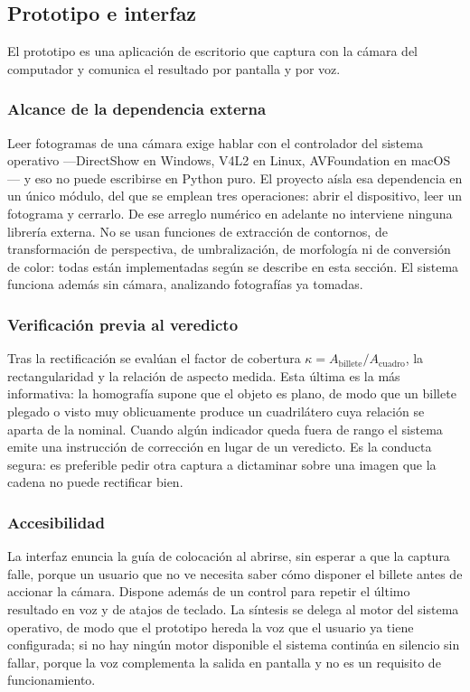 \documentclass[conference]{IEEEtran}
\begin{document}
\subsection{Prototipo e interfaz}

El prototipo es una aplicación de escritorio que captura con la cámara
del computador y comunica el resultado por pantalla y por voz.

\subsubsection{Alcance de la dependencia externa}
Leer fotogramas de una cámara exige hablar con el controlador del
sistema operativo ---DirectShow en Windows, V4L2 en Linux,
AVFoundation en macOS--- y eso no puede escribirse en Python puro. El
proyecto aísla esa dependencia en un único módulo, del que se emplean
tres operaciones: abrir el dispositivo, leer un fotograma y cerrarlo.
De ese arreglo numérico en adelante no interviene ninguna librería
externa. No se usan funciones de extracción de contornos, de
transformación de perspectiva, de umbralización, de morfología ni de
conversión de color: todas están implementadas según se describe en
esta sección. El sistema funciona además sin cámara, analizando
fotografías ya tomadas.

\subsubsection{Verificación previa al veredicto}
Tras la rectificación se evalúan el factor de cobertura
$\kappa = A_{\text{billete}}/A_{\text{cuadro}}$, la rectangularidad y
la relación de aspecto medida. Esta última es la más informativa: la
homografía supone que el objeto es plano, de modo que un billete
plegado o visto muy oblicuamente produce un cuadrilátero cuya relación
se aparta de la nominal. Cuando algún indicador queda fuera de rango el
sistema emite una instrucción de corrección en lugar de un veredicto.
Es la conducta segura: es preferible pedir otra captura a dictaminar
sobre una imagen que la cadena no puede rectificar bien.

\subsubsection{Accesibilidad}
La interfaz enuncia la guía de colocación al abrirse, sin esperar a que
la captura falle, porque un usuario que no ve necesita saber cómo
disponer el billete antes de accionar la cámara. Dispone además de un
control para repetir el último resultado en voz y de atajos de teclado.
La síntesis se delega al motor del sistema operativo, de modo que el
prototipo hereda la voz que el usuario ya tiene configurada; si no hay
ningún motor disponible el sistema continúa en silencio sin fallar,
porque la voz complementa la salida en pantalla y no es un requisito de
funcionamiento.
\end{document}
